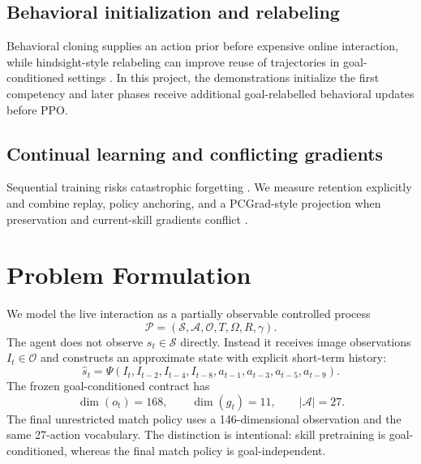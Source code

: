 \documentclass[11pt]{article}
\begin{document}
\subsection{Behavioral initialization and relabeling}
Behavioral cloning supplies an action prior before expensive online interaction, while hindsight-style relabeling can improve reuse of trajectories in goal-conditioned settings \citep{andrychowicz2017her}. In this project, the demonstrations initialize the first competency and later phases receive additional goal-relabelled behavioral updates before PPO.

\subsection{Continual learning and conflicting gradients}
Sequential training risks catastrophic forgetting \citep{kirkpatrick2017ewc}. We measure retention explicitly and combine replay, policy anchoring, and a PCGrad-style projection when preservation and current-skill gradients conflict \citep{yu2020pcgrad}.

\section{Problem Formulation}
We model the live interaction as a partially observable controlled process
\begin{equation}
\mathcal{P}=(\mathcal{S},\mathcal{A},\mathcal{O},T,\Omega,R,\gamma).
\end{equation}
The agent does not observe $s_t\in\mathcal S$ directly. Instead it receives image observations $I_t\in\mathcal O$ and constructs an approximate state with explicit short-term history:
\begin{equation}
\hat{s}_t=\Psi(I_t,I_{t-2},I_{t-4},I_{t-8},a_{t-1},a_{t-3},a_{t-5},a_{t-9}).
\end{equation}
The frozen goal-conditioned contract has
\begin{equation}
\dim(o_t)=168,\qquad \dim(g_t)=11,\qquad |\mathcal A|=27.
\end{equation}
The final unrestricted match policy uses a 146-dimensional observation and the same 27-action vocabulary. The distinction is intentional: skill pretraining is goal-conditioned, whereas the final match policy is goal-independent.
\end{document}
